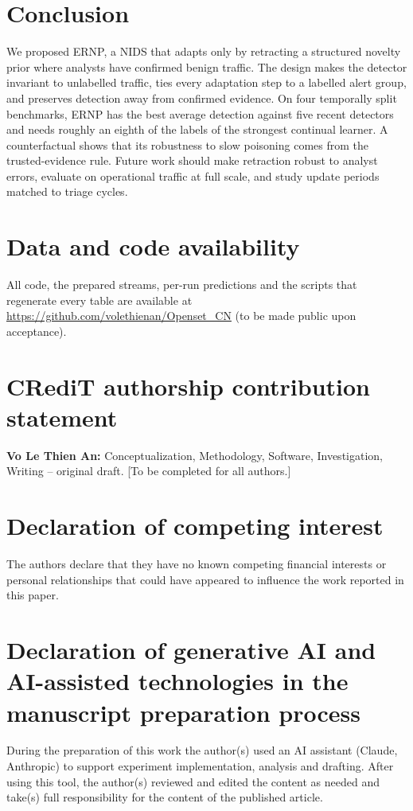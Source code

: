 \documentclass[preprint,12pt]{elsarticle}
\begin{document}
\section{Conclusion}\label{sec:conclusion}
We proposed ERNP, a NIDS that adapts only by retracting a structured novelty prior where analysts have confirmed benign traffic. The design makes the detector invariant to unlabelled traffic, ties every adaptation step to a labelled alert group, and preserves detection away from confirmed evidence. On four temporally split benchmarks, ERNP has the best average detection against five recent detectors and needs roughly an eighth of the labels of the strongest continual learner. A counterfactual shows that its robustness to slow poisoning comes from the trusted-evidence rule. Future work should make retraction robust to analyst errors, evaluate on operational traffic at full scale, and study update periods matched to triage cycles.

\section*{Data and code availability}\label{sec:availability}
All code, the prepared streams, per-run predictions and the scripts that regenerate every table are available at \url{https://github.com/volethienan/Openset_CN} (to be made public upon acceptance).

\section*{CRediT authorship contribution statement}
\textbf{Vo Le Thien An:} Conceptualization, Methodology, Software, Investigation, Writing -- original draft. [To be completed for all authors.]

\section*{Declaration of competing interest}
The authors declare that they have no known competing financial interests or personal relationships that could have appeared to influence the work reported in this paper.

\section*{Declaration of generative AI and AI-assisted technologies in the manuscript preparation process}
During the preparation of this work the author(s) used an AI assistant (Claude, Anthropic) to support experiment implementation, analysis and drafting. After using this tool, the author(s) reviewed and edited the content as needed and take(s) full responsibility for the content of the published article.
\end{document}

